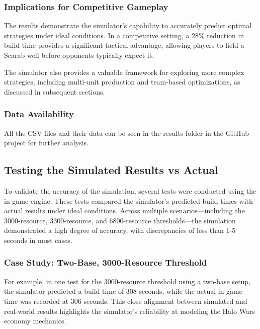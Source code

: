 \documentclass[a4paper, 12pt, english]{article}
\begin{document}
\subsubsection{Implications for Competitive Gameplay}
The results demonstrate the simulator's capability to accurately predict optimal strategies under ideal conditions. In a competitive setting, a 28\% reduction in build time provides a significant tactical advantage, allowing players to field a Scarab well before opponents typically expect it. 
\newline

The simulator also provides a valuable framework for exploring more complex strategies, including multi-unit production and team-based optimizations, as discussed in subsequent sections.
\newline

\subsubsection{Data Availability}
All the CSV files and their data can be seen in the results folder in the GitHub project for further analysis.
\newline

\subsection{Testing the Simulated Results vs Actual}
To validate the accuracy of the simulation, several tests were conducted using the in-game engine. These tests compared the simulator's predicted build times with actual results under ideal conditions. Across multiple scenarios—including the 3000-resource, 3300-resource, and 6800-resource thresholds—the simulation demonstrated a high degree of accuracy, with discrepancies of less than 1-5 seconds in most cases.
\newline

\subsubsection{Case Study: Two-Base, 3000-Resource Threshold}
For example, in one test for the 3000-resource threshold using a two-base setup, the simulator predicted a build time of 308 seconds, while the actual in-game time was recorded at 306 seconds. This close alignment between simulated and real-world results highlights the simulator’s reliability at modeling the Halo Wars economy mechanics. 
\newline
\end{document}
